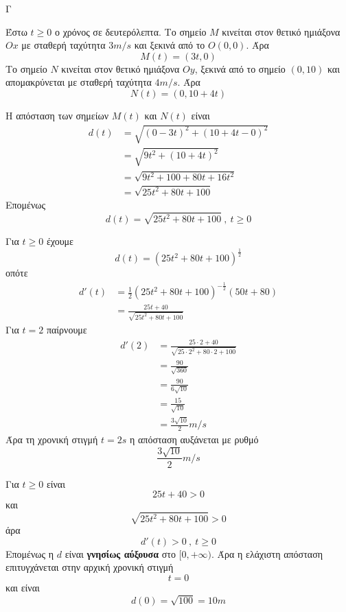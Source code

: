\begin{thema}{Γ}
\begin{erwthma}
\item Έστω $t\geq 0$ ο χρόνος σε δευτερόλεπτα.
Το σημείο $M$ κινείται στον θετικό ημιάξονα $Ox$ με σταθερή ταχύτητα $3\si{m/s}$ και ξεκινά από το $O(0,0)$.
Άρα
\[M(t)=(3t,0)\]
Το σημείο $N$ κινείται στον θετικό ημιάξονα $Oy$, ξεκινά από το σημείο $(0,10)$ και απομακρύνεται με σταθερή ταχύτητα $4\si{m/s}$.
Άρα
\[N(t)=(0,10+4t)\]

\item Η απόσταση των σημείων $M(t)$ και $N(t)$ είναι
\begin{align*}
d(t)&=\sqrt{(0-3t)^2+(10+4t-0)^2}\\
&=\sqrt{9t^2+(10+4t)^2}\\
&=\sqrt{9t^2+100+80t+16t^2}\\
&=\sqrt{25t^2+80t+100}
\end{align*}
Επομένως
\[d(t)=\sqrt{25t^2+80t+100}\ ,\ t\geq 0\]

\item Για $t\geq 0$ έχουμε
\[d(t)=(25t^2+80t+100)^{\frac{1}{2}}\]
οπότε
\begin{align*}
d'(t)&=\frac{1}{2}(25t^2+80t+100)^{-\frac{1}{2}}(50t+80)\\
&=\frac{25t+40}{\sqrt{25t^2+80t+100}}
\end{align*}
Για $t=2$ παίρνουμε
\begin{align*}
d'(2)&=\frac{25\cdot2+40}{\sqrt{25\cdot2^2+80\cdot2+100}}\\
&=\frac{90}{\sqrt{360}}\\
&=\frac{90}{6\sqrt{10}}\\
&=\frac{15}{\sqrt{10}}\\
&=\frac{3\sqrt{10}}{2}\si{m/s}
\end{align*}
Άρα τη χρονική στιγμή $t=2\si{s}$ η απόσταση αυξάνεται με ρυθμό
\[\frac{3\sqrt{10}}{2}\si{m/s}\]

\item Για $t\geq 0$ είναι
\[25t+40>0\]
και
\[\sqrt{25t^2+80t+100}>0\]
άρα
\[d'(t)>0\ ,\ t\geq 0\]
Επομένως η $d$ είναι \textbf{γνησίως αύξουσα} στο $[0,+\infty)$.
Άρα η ελάχιστη απόσταση επιτυγχάνεται στην αρχική χρονική στιγμή
\[t=0\]
και είναι
\[d(0)=\sqrt{100}=10\si{m}\]
\end{erwthma}
\end{thema}

